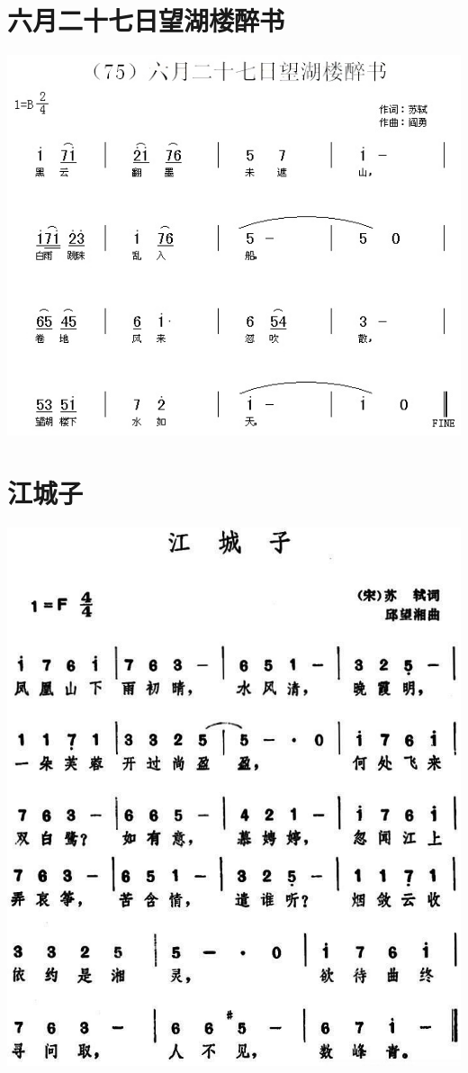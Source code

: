 \documentclass[cn,pad,twocol]{elegantbook}
\begin{document}
\section{六月二十七日望湖楼醉书}
    \includegraphics[width=\textwidth]{dongxiao/20200627-苏轼-六月二十七日望湖楼醉书.jpg} 
\section{江城子}
    \includegraphics[width=\textwidth]{dongxiao/20200627-苏轼-江城子.jpg} 
\end{document}
